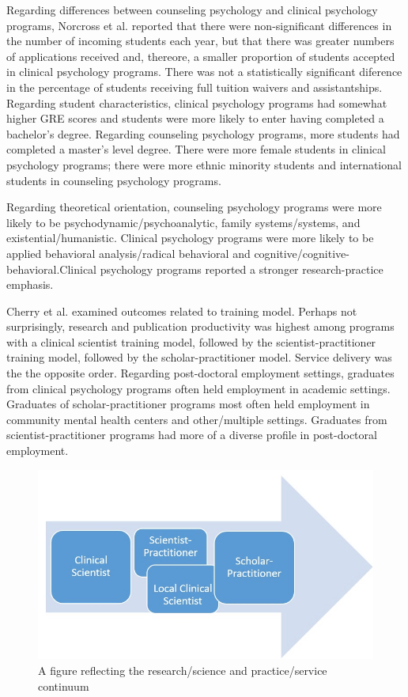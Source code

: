 \documentclass[
  english,
]{book}
\begin{document}
Regarding differences between counseling psychology and clinical psychology programs, Norcross et al.\citeyearpar{norcross_doctoral_2020} reported that there were non-significant differences in the number of incoming students each year, but that there was greater numbers of applications received and, thereore, a smaller proportion of students accepted in clinical psychology programs. There was not a statistically significant diference in the percentage of students receiving full tuition waivers and assistantships. Regarding student characteristics, clinical psychology programs had somewhat higher GRE scores and students were more likely to enter having completed a bachelor's degree. Regarding counseling psychology programs, more students had completed a master's level degree. There were more female students in clinical psychology programs; there were more ethnic minority students and international students in counseling psychology programs.

Regarding theoretical orientation, counseling psychology programs were more likely to be psychodynamic/psychoanalytic, family systems/systems, and existential/humanistic. Clinical psychology programs were more likely to be applied behavioral analysis/radical behavioral and cognitive/cognitive-behavioral.Clinical psychology programs reported a stronger research-practice emphasis.

Cherry et al. \citeyearpar{cherry_examination_2000} examined outcomes related to training model. Perhaps not surprisingly, research and publication productivity was highest among programs with a clinical scientist training model, followed by the scientist-practitioner training model, followed by the scholar-practitioner model. Service delivery was the the opposite order. Regarding post-doctoral employment settings, graduates from clinical psychology programs often held employment in academic settings. Graduates of scholar-practitioner programs most often held employment in community mental health centers and other/multiple settings. Graduates from scientist-practitioner programs had more of a diverse profile in post-doctoral employment.

\begin{figure}
\centering
\includegraphics{images/Tmodels/SciencePracticeContinuum.jpg}
\caption{A figure reflecting the research/science and practice/service continuum}
\end{figure}
\end{document}
